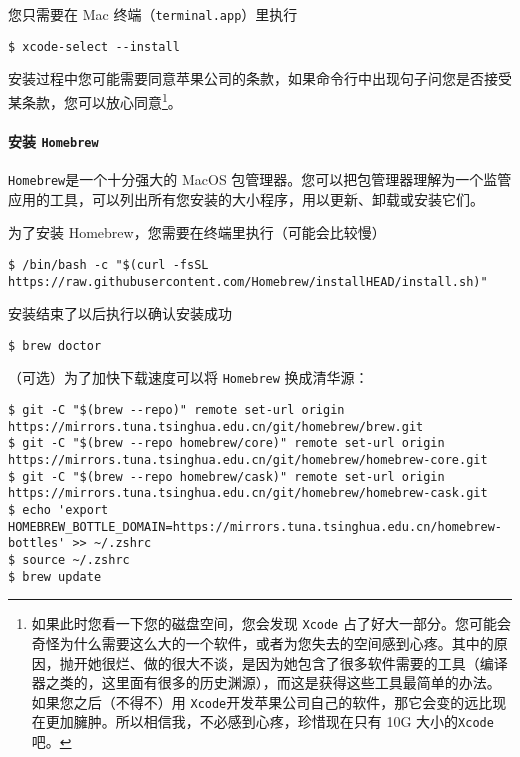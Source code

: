 \documentclass[a4paper]{ctexart}
\begin{document}
您只需要在 Mac 终端（\texttt{terminal.app}）里执行

\begin{verbatim}
$ xcode-select --install
\end{verbatim}

安装过程中您可能需要同意苹果公司的条款，如果命令行中出现句子问您是否接受某条款，您可以放心同意\footnote{如果此时您看一下您的磁盘空间，您会发现 \texttt{Xcode} 占了好大一部分。您可能会奇怪为什么需要这么大的一个软件，或者为您失去的空间感到心疼。其中的原因，抛开她很烂、做的很大不谈，是因为她包含了很多软件需要的工具（编译器之类的，这里面有很多的历史渊源），而这是获得这些工具最简单的办法。如果您之后（不得不）用 \texttt{Xcode}开发苹果公司自己的软件，那它会变的远比现在更加臃肿。所以相信我，不必感到心疼，珍惜现在只有 10G 大小的\texttt{Xcode}吧。}。

\paragraph{安装 \texttt{Homebrew}}
\texttt{Homebrew}是一个十分强大的 MacOS 包管理器。您可以把包管理器理解为一个监管应用的工具，可以列出所有您安装的大小程序，用以更新、卸载或安装它们。

为了安装 Homebrew，您需要在终端里执行（可能会比较慢）

\begin{verbatim}
$ /bin/bash -c "$(curl -fsSL https://raw.githubusercontent.com/Homebrew/installHEAD/install.sh)"
\end{verbatim}

安装结束了以后执行以确认安装成功

\begin{verbatim}
$ brew doctor
\end{verbatim}

（可选）为了加快下载速度可以将 \texttt{Homebrew} 换成清华源：
\begin{verbatim}
$ git -C "$(brew --repo)" remote set-url origin https://mirrors.tuna.tsinghua.edu.cn/git/homebrew/brew.git
$ git -C "$(brew --repo homebrew/core)" remote set-url origin https://mirrors.tuna.tsinghua.edu.cn/git/homebrew/homebrew-core.git
$ git -C "$(brew --repo homebrew/cask)" remote set-url origin https://mirrors.tuna.tsinghua.edu.cn/git/homebrew/homebrew-cask.git
$ echo 'export HOMEBREW_BOTTLE_DOMAIN=https://mirrors.tuna.tsinghua.edu.cn/homebrew-bottles' >> ~/.zshrc
$ source ~/.zshrc
$ brew update
\end{verbatim}
\end{document}
